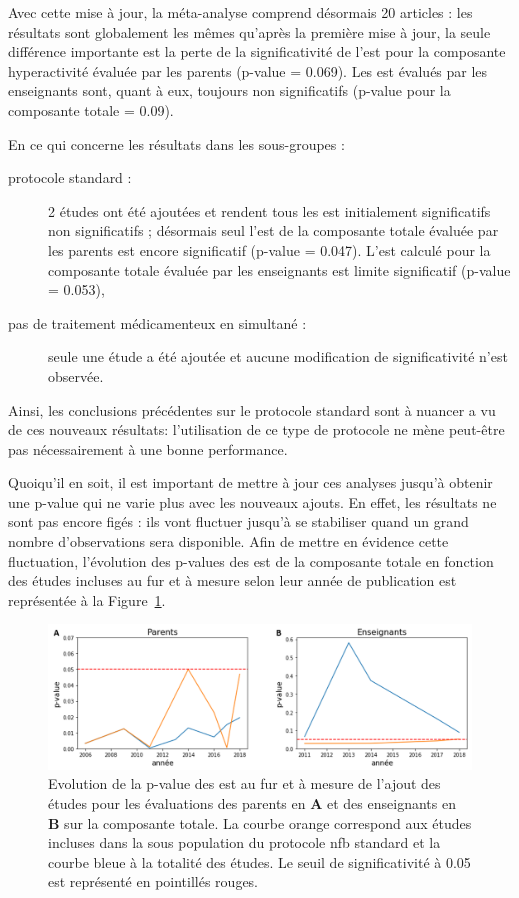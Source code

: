 Avec cette mise à jour, la méta-analyse comprend désormais 20 articles : les résultats sont globalement les mêmes qu'après la première mise à jour, la seule
différence importante est la perte de la significativité de l'\gls{est} pour la composante hyperactivité évaluée par les parents (p-value = 0.069).
Les \gls{est} évalués par les enseignants sont, quant à eux, toujours non significatifs (p-value pour la composante totale =  0.09).

En ce qui concerne les résultats dans les sous-groupes :
\begin{description}
\item[protocole standard :] 2 études ont été ajoutées \citep{Aggensteiner2019, Minder2018} et rendent tous les \gls{est} initialement significatifs 
non significatifs ; désormais seul l'\gls{est} de la composante totale évaluée par les parents est encore significatif (p-value = 0.047). 
L'\gls{est} calculé pour la composante totale évaluée par les enseignants est limite significatif (p-value = 0.053),
\item [pas de traitement médicamenteux en simultané :] seule une étude a été ajoutée \citep{Moreno2019} et aucune modification de significativité
n'est observée.
\end{description}

Ainsi, les conclusions précédentes sur le protocole standard sont à nuancer a vu de ces nouveaux résultats: l'utilisation de ce type de protocole ne mène 
peut-être pas nécessairement à une bonne performance. 

Quoiqu'il en soit, il est important de mettre à jour ces analyses jusqu'à obtenir une p-value qui ne varie plus avec les nouveaux ajouts. En effet, les résultats 
ne sont pas encore figés : ils vont fluctuer jusqu'à se stabiliser quand un grand nombre d'observations sera disponible. Afin de mettre en évidence cette 
fluctuation, l'évolution des p-values des \gls{est} de la composante totale en fonction des études incluses au fur et à mesure selon leur année de publication 
est représentée à la Figure~\ref{Figure:meta_analysis_evolution_pvalue}. 

\begin{figure}[h!]
  \centering
	\includegraphics[width=1\linewidth]{figures/chapter-2/meta-analysis-evolution-p-value} 
  \caption{Evolution de la p-value des \gls{est} au fur et à mesure de l'ajout des études pour les évaluations des 
	parents en \textbf{A} et des enseignants en \textbf{B} sur la composante totale.
	La courbe orange correspond aux études incluses dans la sous population du protocole \gls{nfb} standard et la courbe bleue à la totalité des études.
	Le seuil de significativité à 0.05 est représenté en pointillés rouges.}
  \label{Figure:meta_analysis_evolution_pvalue}
\end{figure}

